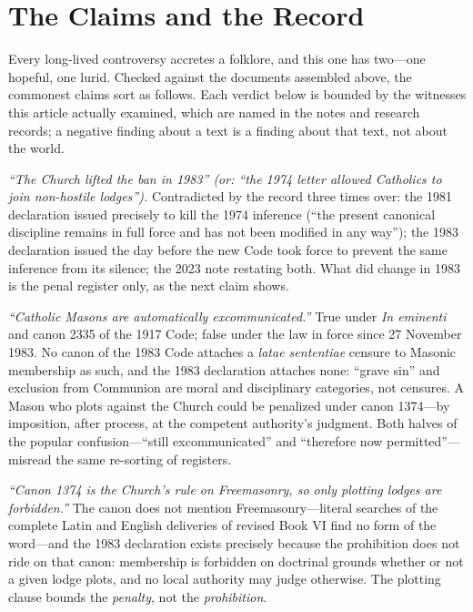 \section{The Claims and the Record}

Every long-lived controversy accretes a folklore, and this one has two---one hopeful, one lurid. Checked against the documents assembled above, the commonest claims sort as follows. Each verdict below is bounded by the witnesses this article actually examined, which are named in the notes and research records; a negative finding about a text is a finding about that text, not about the world.

\emph{``The Church lifted the ban in 1983'' (or: ``the 1974 letter allowed Catholics to join non-hostile lodges'').} Contradicted by the record three times over: the 1981 declaration issued precisely to kill the 1974 inference (``the present canonical discipline remains in full force and has not been modified in any way''); the 1983 declaration issued the day before the new Code took force to prevent the same inference from its silence; the 2023 note restating both. What did change in 1983 is the penal register only, as the next claim shows.

\emph{``Catholic Masons are automatically excommunicated.''} True under \emph{In eminenti} and canon 2335 of the 1917 Code; false under the law in force since 27 November 1983. No canon of the 1983 Code attaches a \emph{latae sententiae} censure to Masonic membership as such, and the 1983 declaration attaches none: ``grave sin'' and exclusion from Communion are moral and disciplinary categories, not censures. A Mason who plots against the Church could be penalized under canon 1374---by imposition, after process, at the competent authority's judgment. Both halves of the popular confusion---``still excommunicated'' and ``therefore now permitted''---misread the same re-sorting of registers.

\emph{``Canon 1374 is the Church's rule on Freemasonry, so only plotting lodges are forbidden.''} The canon does not mention Freemasonry---literal searches of the complete Latin and English deliveries of revised Book VI find no form of the word---and the 1983 declaration exists precisely because the prohibition does not ride on that canon: membership is forbidden on doctrinal grounds whether or not a given lodge plots, and no local authority may judge otherwise. The plotting clause bounds the \emph{penalty}, not the \emph{prohibition}.

